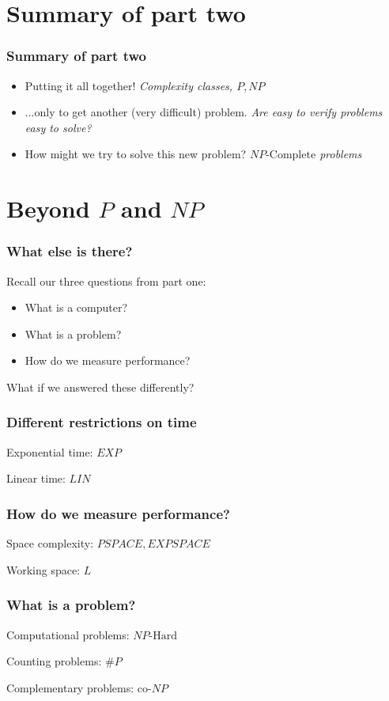 \documentclass[aspectratio=169]{beamer}
\begin{document}
\section{Summary of part two}

\begin{frame}
\frametitle{Summary of part two}
\begin{itemize}
    \item Putting it all together! {\em Complexity classes, $P, NP$}
    \item ...only to get another (very difficult) problem. {\em Are easy to verify problems easy to solve?}
    \item How might we try to solve this new problem? {\em $NP\text{-Complete}$ problems}
\end{itemize}
\end{frame}

\section{Beyond $P$ and $NP$}

\begin{frame}
\frametitle{What else is there?}
Recall our three questions from part one:
\begin{itemize}
    \item What is a computer?
    \item What is a problem?
    \item How do we measure performance?
\end{itemize}
What if we answered these differently?
\end{frame}

\begin{frame}
\frametitle{Different restrictions on time}
Exponential time: $EXP$

Linear time: $LIN$
\end{frame}

\begin{frame}
\frametitle{How do we measure performance?}
Space complexity: $PSPACE, EXPSPACE$

Working space: $L$
\end{frame}

\begin{frame}
\frametitle{What is a problem?}
Computational problems: $NP\text{-Hard}$

Counting problems: $\#P$

Complementary problems: $\text{co-}NP$
\end{frame}
\end{document}
